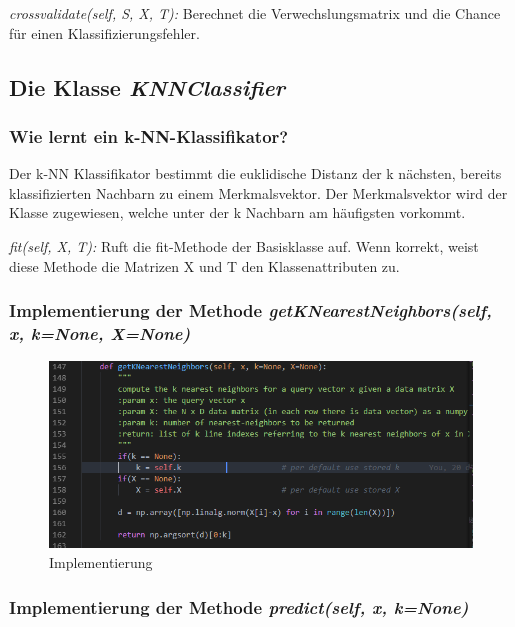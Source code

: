 \noindent
\textit{crossvalidate(self, S, X, T):} Berechnet die Verwechslungsmatrix und
die Chance für einen Klassifizierungsfehler.

\subsection{Die Klasse \textit{KNNClassifier}}

\subsubsection{Wie lernt ein k-NN-Klassifikator?}

Der k-NN Klassifikator bestimmt die euklidische Distanz der k nächsten, bereits klassifizierten Nachbarn zu einem Merkmalsvektor.  Der Merkmalsvektor wird der Klasse zugewiesen, welche unter der k Nachbarn am häufigsten vorkommt. 

\vspace{5px}
\noindent
\noindent
\textit{fit(self, X, T):} Ruft die fit-Methode der Basisklasse auf. Wenn korrekt, weist diese Methode die Matrizen X und T den Klassenattributen zu.

\subsubsection{
    Implementierung der Methode \textit{getKNearestNeighbors(self, x, k=None, X=None)}
    }

\begin{figure}[H]
    \centering
    \includegraphics[width=1\linewidth]{files/aufgabe2b2.png}
    \caption{Implementierung}
\end{figure}

\subsubsection{Implementierung der Methode \textit{predict(self, x, k=None)}}

